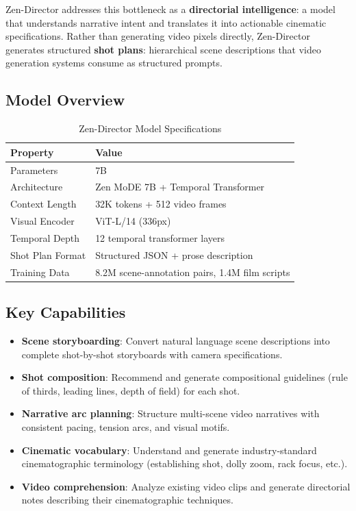 \documentclass[11pt,a4paper]{article}
\begin{document}
Zen-Director addresses this bottleneck as a \textbf{directorial intelligence}: a model that
understands narrative intent and translates it into actionable cinematic specifications. Rather
than generating video pixels directly, Zen-Director generates structured \textbf{shot plans}:
hierarchical scene descriptions that video generation systems consume as structured prompts.

\subsection{Model Overview}

\begin{table}[H]
\centering
\begin{tabular}{ll}
\toprule
\textbf{Property} & \textbf{Value} \\
\midrule
Parameters & 7B \\
Architecture & Zen MoDE 7B + Temporal Transformer \\
Context Length & 32K tokens + 512 video frames \\
Visual Encoder & ViT-L/14 (336px) \\
Temporal Depth & 12 temporal transformer layers \\
Shot Plan Format & Structured JSON + prose description \\
Training Data & 8.2M scene-annotation pairs, 1.4M film scripts \\
\bottomrule
\end{tabular}
\caption{Zen-Director Model Specifications}
\end{table}

\subsection{Key Capabilities}

\begin{itemize}
    \item \textbf{Scene storyboarding}: Convert natural language scene descriptions into
    complete shot-by-shot storyboards with camera specifications.
    \item \textbf{Shot composition}: Recommend and generate compositional guidelines (rule of
    thirds, leading lines, depth of field) for each shot.
    \item \textbf{Narrative arc planning}: Structure multi-scene video narratives with consistent
    pacing, tension arcs, and visual motifs.
    \item \textbf{Cinematic vocabulary}: Understand and generate industry-standard cinematographic
    terminology (establishing shot, dolly zoom, rack focus, etc.).
    \item \textbf{Video comprehension}: Analyze existing video clips and generate directorial
    notes describing their cinematographic techniques.
\end{itemize}
\end{document}
